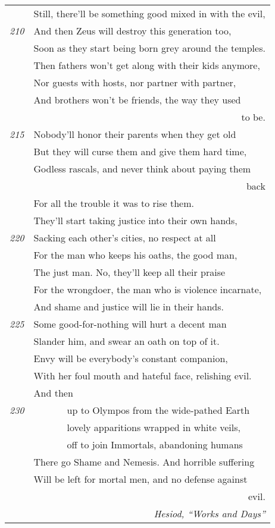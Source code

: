 \begin{tabular}[bht]{rl}
& Still, there'll be something good mixed in with the evil, \\
\tiny{\em 210}& And then Zeus will destroy this generation too, \\
& Soon as they start being born grey around the temples. \\
& Then fathers won't get along with their kids anymore, \\
& Nor guests with hosts, nor partner with partner, \\
& And brothers won't be friends, the way they used\\
  \multicolumn{2}{r}{ to be.} \\
\tiny{\em 215}& Nobody'll honor their parents when they get old \\
& But they will curse them and give them hard time, \\
& Godless rascals, and never think about paying them\\
  \multicolumn{2}{r}{ back} \\
& For all the trouble it was to rise them. \\
& They'll start taking justice into their own hands, \\
\tiny{\em 220}& Sacking each other's cities, no respect at all \\
& For the man who keeps his oaths, the good man, \\
& The just man. No, they'll keep all their praise \\
& For the wrongdoer, the man who is violence incarnate, \\
& And shame and justice will lie in their hands. \\
\tiny{\em 225}& Some good-for-nothing will hurt a decent man \\
& Slander him, and swear an oath on top of it. \\
& Envy will be everybody's constant companion, \\
& With her foul mouth and hateful face, relishing evil.\\
& And then \\
\tiny{\em 230} & \ \ \ \ \ \ \ up to Olympos from the wide-pathed Earth \\
& \ \ \ \ \ \ \ lovely apparitions wrapped in white veils, \\
& \ \ \ \ \ \ \ off to join Immortals, abandoning humans \\
& There go Shame and Nemesis. And horrible suffering \\
& Will be left for mortal men, and no defense against\\
  \multicolumn{2}{r}{ evil.} \\[2.2ex]
\multicolumn{2}{r}{\em Hesiod, ``Works and Days''} \\[4ex]
\end{tabular}
%
%


